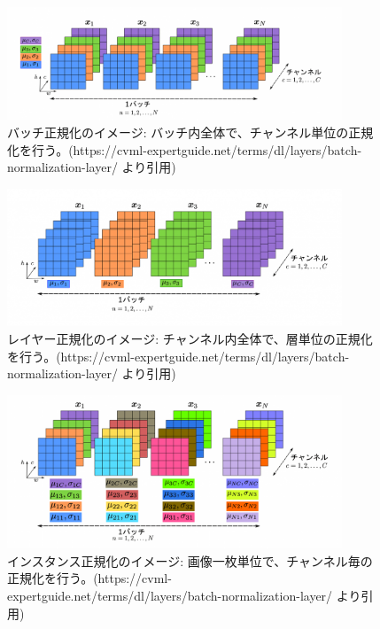\documentclass{ltjsarticle}
\begin{document}
\begin{figure}[htbp]
  \centering
  \includegraphics[width=10cm]{./capture/Batch_Normalization.png}
  \caption{バッチ正規化のイメージ: バッチ内全体で、チャンネル単位の正規化を行う。(https://cvml-expertguide.net/terms/dl/layers/batch-normalization-layer/ より引用)}
  \label{fig:Batch_Normalization}
\end{figure}

\begin{figure}[htbp]
  \centering
  \includegraphics[width=10cm]{./capture/Layer_Normalization.png}
  \caption{レイヤー正規化のイメージ: チャンネル内全体で、層単位の正規化を行う。(https://cvml-expertguide.net/terms/dl/layers/batch-normalization-layer/ より引用)}
  \label{fig:Layer_Normalization}
\end{figure}

\begin{figure}[htbp]
  \centering
  \includegraphics[width=10cm]{./capture/Instance_Normalization.png}
  \caption{インスタンス正規化のイメージ: 画像一枚単位で、チャンネル毎の正規化を行う。(https://cvml-expertguide.net/terms/dl/layers/batch-normalization-layer/ より引用)}
  \label{fig:Instance_Normalization}
\end{figure}
\end{document}
